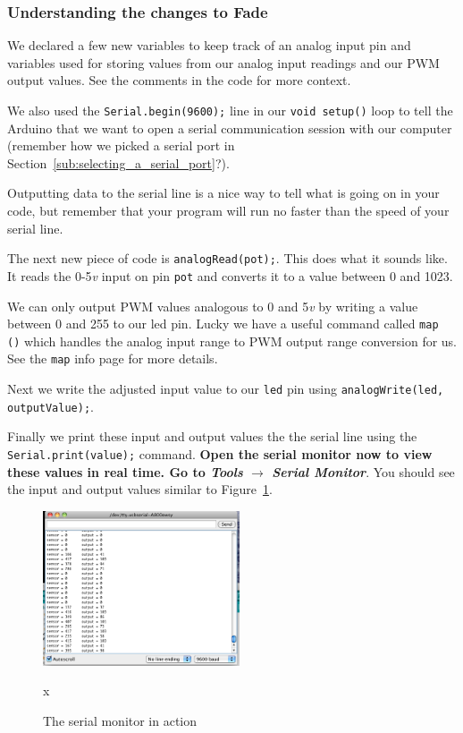 \documentclass[11pt,a4paper]{article}
\begin{document}
\subsubsection{Understanding the changes to \textbf{Fade}} %
\label{ssub:understanding_the_changes_to_fade}

We declared a few new variables to keep track of an analog input pin and variables used for storing values from our analog input readings and our PWM output values.  See the comments in the code for more context.  

We also used the 
\texttt{Serial.begin(9600);} line in our \texttt{void setup()} loop to tell the Arduino that we want to open a serial communication session with our computer (remember how we picked a serial port in Section~\ref{sub:selecting_a_serial_port}?).

Outputting data to the serial line is a nice way to tell what is going on in your code, but remember that your program will run no faster than the speed of your serial line.

The next new piece of code is \texttt{analogRead(pot);}.  This does what it sounds like.  It reads the 0-5\emph{v} input on pin \texttt{pot} and converts it to a value between 0 and 1023.

We can only output PWM values analogous to 0 and 5\emph{v} by writing a value between 0 and 255 to our led pin.  Lucky we have a useful command called \texttt{map ()} which handles the analog input range to PWM output range conversion for us.  See the \texttt{map} info page for more details.\cite{map}

Next we write the adjusted input value to our \texttt{led} pin using \texttt{analogWrite(led, outputValue);}. 

Finally we print these input and output values the the serial line using the \texttt{Serial.print(value);} command.  \textbf{Open the serial monitor now to view these values in real time.  Go to \emph{Tools} $\rightarrow$  \emph{Serial Monitor}}.  You should see the input and output values similar to Figure~\ref{fig:figures_serial-mon}.

\begin{figure}[htbp]
    \centering
        \includegraphics[height=1.8in]{figures/serial-mon.png}
    \caption{The serial monitor in action}x
    \label{fig:figures_serial-mon}
\end{figure}
\end{document}
